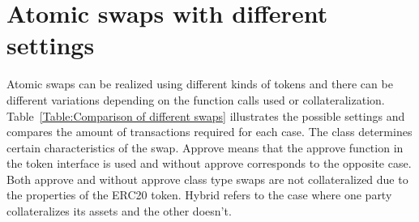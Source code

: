\section{Atomic swaps with different settings}
Atomic swaps can be realized using different kinds of tokens and there can be different variations depending on the function calls used or collateralization. Table~\ref{Table:Comparison of different swaps} illustrates the possible settings and compares the amount of transactions required for each case. %
The class determines certain characteristics of the swap. Approve means that the approve function in the token interface is used and without approve corresponds to the opposite case. Both approve and without approve class type swaps are not collateralized due to the properties of the ERC20 token. Hybrid refers to the  case where one party collateralizes its assets and the other doesn't.

